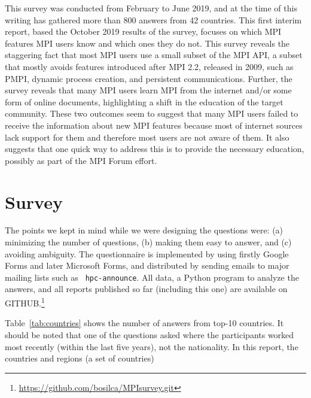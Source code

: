 \documentclass[sigconf,nonacm]{acmart}
\begin{document}
This survey was conducted from February to June 2019, and at the time of
this writing has gathered more than 800 answers from 42 countries.
%
This first interim report, based the October 2019 results of the survey,
focuses on which MPI features MPI users know and which ones they do not.
%
This survey reveals the staggering fact that most MPI users use a small subset
of the MPI API, a subset that mostly avoids features introduced after MPI 2.2,
released in 2009, such as PMPI, dynamic process creation, and persistent
communications. Further, the survey reveals that many MPI users learn MPI
from the internet and/or some form of online documents, highlighting a shift in
the education of the target community.
%
These two outcomes seem to suggest that many MPI users failed to receive the
information about new MPI features because most of internet sources lack
support for them and therefore most users are not aware of them. It also suggests
that one quick way to address this is to provide the necessary education,
possibly as part of the MPI Forum effort.

\section{Survey}

The points we kept in mind while we were designing the questions were: (a)
minimizing the number of questions, (b) making them easy to answer, and (c) avoiding ambiguity. The
questionnaire is implemented by using firstly Google Forms and later Microsoft
Forms, and distributed by sending emails to major mailing lists such as {\tt
hpc-announce}. All data, a Python program to analyze the answers, and all
reports published so far (including this one) are available on
GITHUB.\footnote{\url{https://github.com/bosilca/MPIsurvey.git}}

Table~\ref{tab:countries} shows the number of answers from top-10
countries. It should be noted that one of the questions asked where the participants worked most recently 
(within the last five years), not the nationality.
In this report, the countries and regions (a set of countries) 
\vspace{-3mm}
\end{document}
